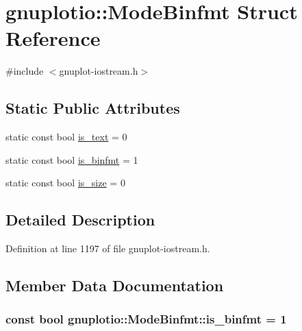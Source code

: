 \hypertarget{structgnuplotio_1_1_mode_binfmt}{}\section{gnuplotio\+:\+:Mode\+Binfmt Struct Reference}
\label{structgnuplotio_1_1_mode_binfmt}


{\ttfamily \#include $<$gnuplot-\/iostream.\+h$>$}

\subsection*{Static Public Attributes}
\begin{DoxyCompactItemize}
\item 
static const bool \hyperlink{structgnuplotio_1_1_mode_binfmt_a7ab187fe922cac23b0d39ade81e5eb56}{is\+\_\+text} = 0
\item 
static const bool \hyperlink{structgnuplotio_1_1_mode_binfmt_ab0d5d3718364cdea0347f93ec121d841}{is\+\_\+binfmt} = 1
\item 
static const bool \hyperlink{structgnuplotio_1_1_mode_binfmt_a40a5a8ee815d6a5e9a3c30c8290a6967}{is\+\_\+size} = 0
\end{DoxyCompactItemize}


\subsection{Detailed Description}


Definition at line 1197 of file gnuplot-\/iostream.\+h.



\subsection{Member Data Documentation}
\subsubsection[{\texorpdfstring{is\+\_\+binfmt}{is_binfmt}}]{\setlength{\rightskip}{0pt plus 5cm}const bool gnuplotio\+::\+Mode\+Binfmt\+::is\+\_\+binfmt = 1\hspace{0.3cm}{\ttfamily [static]}}\hypertarget{structgnuplotio_1_1_mode_binfmt_ab0d5d3718364cdea0347f93ec121d841}{}\label{structgnuplotio_1_1_mode_binfmt_ab0d5d3718364cdea0347f93ec121d841}


